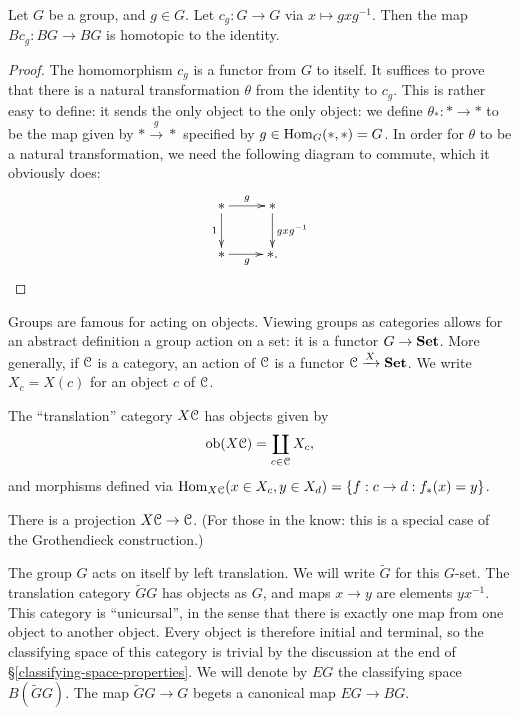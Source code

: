 \begin{lemma}\label{conjugation-homotopic}
    Let $G$ be a group, and $g\in G$.  Let $c_g:G\to G$ via $x\mapsto
    gxg^{-1}$.  Then the map $Bc_g:BG\to BG$ is homotopic to the identity.
\end{lemma}
\begin{proof}
    The homomorphism $c_g$ is a functor from $G$ to itself. It suffices to
    prove that there is a natural transformation $\theta$ from the identity to
    $c_g$. This is rather easy to define: it sends the only object to the only
    object: we define $\theta_\ast:\ast\to \ast$ to be the map given by
    $\ast\xrightarrow{g}\ast$ specified by $g\in \operatorname{Hom}_G(\ast,\ast) = G$. In
    order for $\theta$ to be a natural transformation, we need the following
    diagram to commute, which it obviously does:
    \begin{equation*}
	\xymatrix{
	    \ast\ar[d]_1\ar[r]^g & \ast\ar[d]^{gxg^{-1}}\\
	    \ast\ar[r]_{g} & \ast.
	    }
    \end{equation*}
\end{proof}
Groups are famous for acting on objects. Viewing groups as categories allows
for an abstract definition a group action on a set: it is a functor $G\to
\mathbf{Set}$. More generally, if $\mathcal C$ is a category, an action of $\mathcal C$ is a functor
$\mathcal C\xrightarrow{X}\mathbf{Set}$. We write $X_c = X(c)$ for an object $c$ of $\mathcal C$.
\begin{definition}
    The ``translation'' category $X\mathcal C$ has objects given by
    $$\mathrm{ob}(X\mathcal C) = \coprod_{c\in \mathcal C}X_c,$$
    and morphisms defined via $\operatorname{Hom}_{X\mathcal C}(x\in X_c, y\in X_d) = \{f:c\to
    d:f_\ast(x) = y\}$.
\end{definition}
There is a projection $X\mathcal C\to \mathcal C$. (For those in the know: this is a special
case of the Grothendieck construction.)
\begin{example}
    The group $G$ acts on itself by left translation. We will write
    $\widetilde{G}$ for this $G$-set. The translation category $\widetilde{G}G$
    has objects as $G$, and maps $x\to y$ are elements $yx^{-1}$. This category
    is ``unicursal'', in the sense that there is exactly one map from one
    object to another object. Every object is therefore initial and terminal,
    so the classifying space of this category is trivial by the discussion at
    the end of \S \ref{classifying-space-properties}. We will denote by $EG$
    the classifying space $B(\widetilde{G}G)$. The map $\widetilde{G}G\to G$
    begets a canonical map $EG\to BG$.
\end{example}
